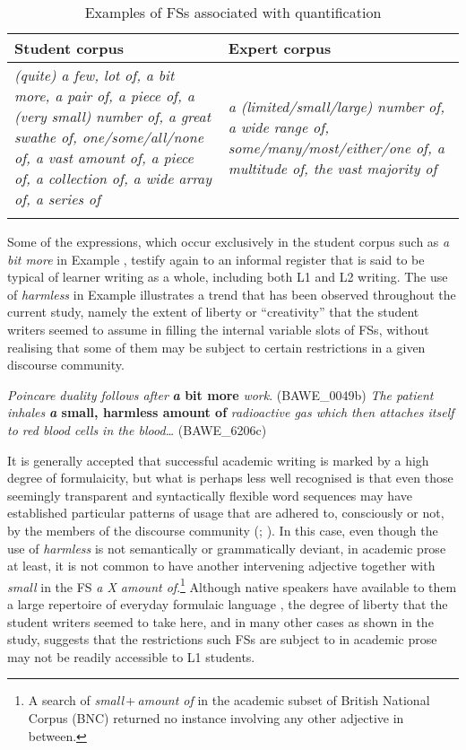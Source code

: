 \documentclass[output=paper]{langscibook}
\begin{document}
\begin{table}
\begin{tabularx}{\textwidth}{QQ}
\lsptoprule
Student corpus & Expert corpus\\\midrule
\textit{(quite) a few, lot of, a bit more, a pair of, a piece of, a (very small) number of, a great swathe of, one/some/all/none of, a vast amount of, a piece of, a collection of, a wide array of, a series of} & \textit{a (limited/small/large) number of, a wide range of, some/many/most/either/one of, a multitude of, the vast majority of}\\
\lspbottomrule
\end{tabularx}
\caption{Examples of FSs associated with quantification\label{tab:wang:10}}
\end{table}

Some of the expressions, which occur exclusively in the student corpus such as \textit{a bit more} in Example , testify again to an informal register that is said to be typical of learner writing as a whole, including both L1 and L2 writing. The use of \textit{harmless} in Example  illustrates a trend that has been observed throughout the current study, namely the extent of liberty or ``creativity'' that the student writers seemed to assume in filling the internal variable slots of FSs, without realising that some of them may be subject to certain restrictions in a given discourse community. 

\ea \label{ex:wang:8}\textit{Poincare duality follows after} \textbf{\textit{a} \textbf{bit} \textbf{more}} \textit{work}. (BAWE\_0049b)
\ex \label{ex:wang:9}\textit{The patient inhales} \textbf{\textit{a} \textbf{small,} \textbf{harmless} \textbf{amount} \textbf{of}} \textit{radioactive gas which then attaches itself to red blood cells in the blood…} (BAWE\_6206c)
\z

It is generally accepted that successful academic writing is marked by a high degree of formulaicity, but what is perhaps less well recognised is that even those seemingly transparent and syntactically flexible word sequences may have established particular patterns of usage that are adhered to, consciously or not, by the members of the discourse community (\citealt{Pérez-Llantada2014}; \citealt{Wang2018}). In this case, even though the use of \textit{harmless} is not semantically or grammatically deviant, in academic prose at least, it is not common to have another intervening adjective together with \textit{small} in the FS \textit{a X amount of}.\footnote{A search of \textit{small}\,+\,\textit{amount of} in the academic subset of British National Corpus (BNC) returned no instance involving any other adjective in between.} Although native speakers have available to them a large repertoire of everyday formulaic language \citep{Sinclair1991}, the degree of liberty that the student writers seemed to take here, and in many other cases as shown in the study, suggests that the restrictions such FSs are subject to in academic prose may not be readily accessible to L1 students.
\end{document}
